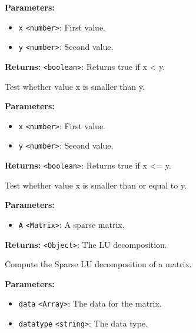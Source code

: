 \documentclass[12pt,a4paper]{article}
\begin{document}
\noindent \textbf{Parameters:}
\begin{itemize}
  \item \texttt{x} \texttt{<number>}: First value.
  \item \texttt{y} \texttt{<number>}: Second value.
\end{itemize}

\noindent \textbf{Returns:} \texttt{<boolean>}: Returns true if x < y.

\noindent Test whether value x is smaller than y.

\vspace{5mm}
\noindent {}


\noindent \textbf{Parameters:}
\begin{itemize}
  \item \texttt{x} \texttt{<number>}: First value.
  \item \texttt{y} \texttt{<number>}: Second value.
\end{itemize}

\noindent \textbf{Returns:} \texttt{<boolean>}: Returns true if x <= y.

\noindent Test whether value x is smaller than or equal to y.

\vspace{5mm}
\noindent {}


\noindent \textbf{Parameters:}
\begin{itemize}
  \item \texttt{A} \texttt{<Matrix>}: A sparse matrix.
\end{itemize}

\noindent \textbf{Returns:} \texttt{<Object>}: The LU decomposition.

\noindent Compute the Sparse LU decomposition of a matrix.

\vspace{5mm}
\noindent {}


\noindent \textbf{Parameters:}
\begin{itemize}
  \item \texttt{data} \texttt{<Array>}: The data for the matrix.
  \item \texttt{datatype} \texttt{<string>}: The data type.
\end{itemize}
\end{document}
